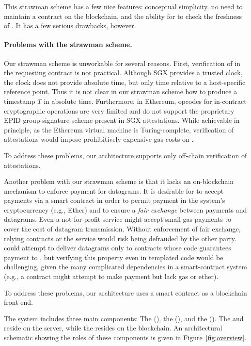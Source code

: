 {This strawman scheme has a few nice features: conceptual simplicity, no need to maintain a \tc contract on the blockchain, and the ability for \reqcont to check the freshness of \att. It has a few serious drawbacks, however.

\paragraph{Problems with the strawman scheme.}
Our strawman scheme is unworkable for several reasons. First, verification of \att in the requesting contract \reqcont is not practical. Although SGX provides a 
trusted clock, the clock does not provide absolute time, but only time relative to a host-specific reference point.
Thus it is not clear in our strawman scheme how to produce a timestamp $T$ in absolute time. Furthermore, in Ethereum, opcodes for in-contract cryptographic operations are very limited and do not support the proprietary EPID group-signature scheme present in SGX attestations. While achievable in principle, as the Ethereum virtual machine is Turing-complete, verification of attestations would impose prohibitively expensive gas costs on \reqcont. 

To address these problems, our \tc architecture supports only off-chain verification of attestations.

Another problem with our strawman scheme is that it lacks an on-blockchain mechanism to enforce payment for datagrams. It is desirable for \tc to accept payments via a smart contract in order to permit payment in the system's cryptocurrency (e.g., Ether) and to ensure a {\em fair exchange} between payments and datagrams. Even a not-for-profit \tc service might accept small gas payments to cover the cost of datagram transmission. Without enforcement of fair exchange, relying contracts or the \tc service would risk being defrauded by the other party. \tc could attempt to deliver datagrams only to contracts whose code guarantees payment to \tc, but verifying this property even in templated code would be challenging, given the many complicated dependencies in a smart-contract system (e.g., a contract might attempt to make payment but lack gas or ether). 

To address these problems, our \tc architecture uses a smart contract \tcont as a blockchain front end.
\fi

The \tcs system includes three main components: The \tcontract (\tcont), the \encname (\engine), and the \medname (\relay). The \encname and \medname reside on the \tc server, while the \tcontract  resides on the blockchain. An architectural schematic showing the roles of these components is given in Figure~\ref{fig:overview}.

}
